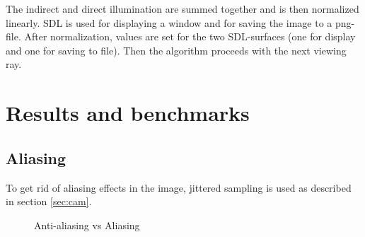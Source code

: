\documentclass[a4paper]{report}
\begin{document}
The indirect and direct illumination are summed together and is
then normalized linearly. SDL \cite{sdl} is used for
displaying a window and for saving the image to a png-file. After
normalization, values are set for the two SDL-surfaces (one for
display and one for saving to file). Then the
algorithm proceeds with the next viewing ray.

\chapter{Results and benchmarks}
\label{ch:results}

\section{Aliasing}

To get rid of aliasing effects in the image, jittered sampling is used
as described in section \ref{sec:cam}.

\begin{figure}[h]
  \centering
  \caption{Anti-aliasing vs Aliasing}
  \label{fig:aliasingcomp}
\end{figure}
\end{document}
